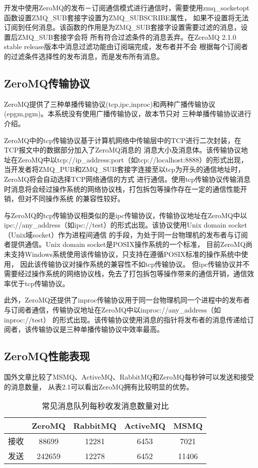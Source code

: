 开发中使用ZeroMQ的发布－订阅通信模式进行通信时，需要使用zmq\_socketopt函数设置ZMQ\_SUB套接字设置为ZMQ\_SUBSCRIBE属性，
如果不设置将无法订阅到任何消息。该函数的作用是为ZMQ\_SUB套接字设置需要过滤的消息，设置后ZMQ\_SUB套接字会将
所有符合过滤条件的消息丢弃。在ZeroMQ 2.1.0 stable release版本中消息过滤功能由订阅端完成，发布者并不会
根据每个订阅者的过滤条件选择性的发布消息，而是发布所有消息。

\subsection{ZeroMQ传输协议}
ZeroMQ提供了三种单播传输协议(tcp,ipc,inproc)和两种广播传输协议(epgm,pgm)。本系统没有使用广播传输协议，故本节只对
三种单播传输协议进行介绍。

ZeroMQ中的tcp传输协议基于计算机网络中传输层中的TCP进行二次封装，在TCP报文中的数据部分加入了ZeroMQ消息的
消息大小及消息体。该传输协议地址在ZeroMQ中以tcp://ip\_address:port（如tcp://localhost:8888）的形式出现，
当开发者将ZMQ\_PUB和ZMQ\_SUB套接字连接至以tcp为开头的通信地址时，ZeroMQ将会自动选择TCP网络通信的方式
进行通信。使用tcp传输协议传输消息时消息将会经过操作系统的网络协议栈，打包拆包等操作存在一定的通信性能开销，但对不同操作系统
的兼容性较好。

与ZeroMQ的tcp传输协议相类似的是ipc传输协议，传输协议地址在ZeroMQ中以ipc://any\_address（如ipc://test）的形式出现。该协议使用Unix domain socket（Unix域socket）作为进程间通信
的手段，为处于同一台物理机的发布者与订阅者提供通信。Unix domain socket是POSIX操作系统的一个标准，
目前ZeroMQ尚未支持Windows系统使用该传输协议，只支持在遵循POSIX标准的操作系统中使用，
因此该传输协议对操作系统的兼容性不如tcp传输协议。
但ipc传输协议并不需要经过操作系统的网络协议栈，免去了打包拆包等操作带来的通信开销，通信效率优于tcp传输协议。

此外，ZeroMQ还提供了inproc传输协议用于同一台物理机同一个进程中的发布者与订阅者通信，传输协议地址在ZeroMQ中以inproc://any\_address（如inproc://test）
的形式出现。该传输协议使用消息的指针将发布者的消息传递给订阅者，该传输协议是三种单播传输协议中效率最高。

\subsection{ZeroMQ性能表现}
国外文章\cite{mqcompare}比较了MSMQ、ActiveMQ、RabbitMQ和ZeroMQ每秒钟可以发送和接受的消息数量，
从表2.1可以看出ZeroMQ拥有比较明显的优势。
\begin{table}[htb]
  \centering\small
  \caption{常见消息队列每秒收发消息数量对比\cite{mqcompare}}
  \label{tab:exampletable}
  \begin{tabular}{ccccc}
    \toprule
    & ZeroMQ & RabbitMQ & ActiveMQ & MSMQ \\
    \midrule
    接收 & 88699 & 12281 & 6453 & 7021 \\
    发送 & 242659 & 12278 & 6452 & 11406 \\
    \bottomrule
  \end{tabular}
\end{table}

